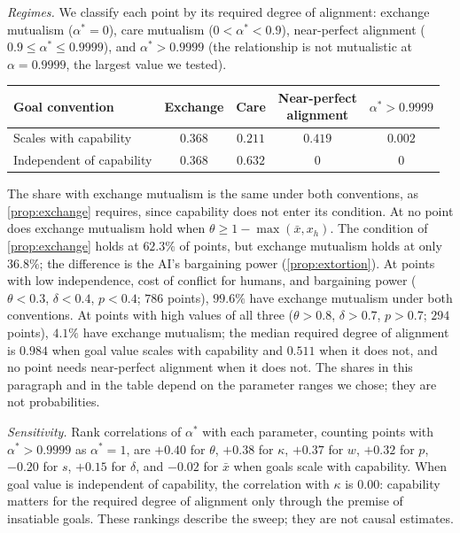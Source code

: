 \documentclass[article, 11pt, reqno]{amsart}
\theoremstyle{named}
\theoremstyle{plain}
\begin{document}
\textit{Regimes.} We classify each point by its required degree of alignment: exchange mutualism ($\alpha^* = 0$), care mutualism ($0 < \alpha^* < 0.9$), near-perfect alignment ($0.9 \le \alpha^* \le 0.9999$), and $\alpha^* > 0.9999$ (the relationship is not mutualistic at $\alpha = 0.9999$, the largest value we tested).
\begin{center}
\begin{tabular}{lcccc}
\toprule
Goal convention & Exchange & Care & \shortstack{Near-perfect\\alignment} & $\alpha^* > 0.9999$ \\
\midrule
Scales with capability & $0.368$ & $0.211$ & $0.419$ & $0.002$ \\
Independent of capability & $0.368$ & $0.632$ & $0$ & $0$ \\
\bottomrule
\end{tabular}
\end{center}
The share with exchange mutualism is the same under both conventions, as \cref{prop:exchange} requires, since capability does not enter its condition. At no point does exchange mutualism hold when $\theta \ge 1 - \max(\bar{x}, x_h)$. The condition of \cref{prop:exchange} holds at $62.3\%$ of points, but exchange mutualism holds at only $36.8\%$; the difference is the AI's bargaining power (\cref{prop:extortion}). At points with low independence, cost of conflict for humans, and bargaining power ($\theta < 0.3$, $\delta < 0.4$, $p < 0.4$; $786$ points), $99.6\%$ have exchange mutualism under both conventions. At points with high values of all three ($\theta > 0.8$, $\delta > 0.7$, $p > 0.7$; $294$ points), $4.1\%$ have exchange mutualism; the median required degree of alignment is $0.984$ when goal value scales with capability and $0.511$ when it does not, and no point needs near-perfect alignment when it does not. The shares in this paragraph and in the table depend on the parameter ranges we chose; they are not probabilities.

\textit{Sensitivity.} Rank correlations of $\alpha^*$ with each parameter, counting points with $\alpha^* > 0.9999$ as $\alpha^* = 1$, are $+0.40$ for $\theta$, $+0.38$ for $\kappa$, $+0.37$ for $w$, $+0.32$ for $p$, $-0.20$ for $s$, $+0.15$ for $\delta$, and $-0.02$ for $\bar{x}$ when goals scale with capability. When goal value is independent of capability, the correlation with $\kappa$ is $0.00$: capability matters for the required degree of alignment only through the premise of insatiable goals. These rankings describe the sweep; they are not causal estimates.
\end{document}
